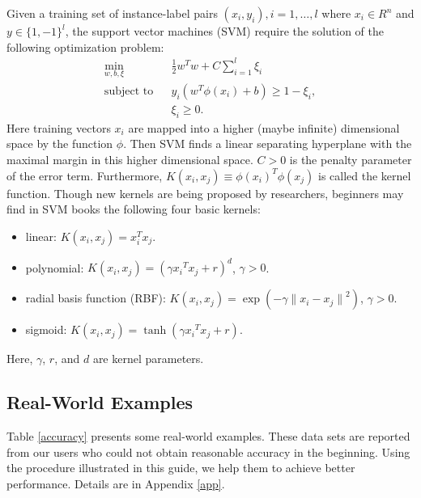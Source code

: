 \documentclass[12pt]{article}
\begin{document}
Given a training set of
instance-label pairs  $(x_i,y_i), i = 1, \ldots, l$
where $x_i \in R^n$ and $y \in
\{1, -1 \}^l$,
the support vector machines (SVM)
\cite{BB92a,CC95a} require
the solution of the following optimization
problem:
 \begin{eqnarray}
\min_{w,b,\xi} && \frac{1}{2}w^T w + C \sum_{i=1}^l \xi_i
\nonumber \\
\mbox{subject to}&& y_i(w^T \phi(x_i) + b) \geq 1 - \xi_i,\label{svml1}\\
&& \xi_i \geq 0. \nonumber
\end{eqnarray}
Here training vectors $x_i$ are mapped into a
higher (maybe infinite) dimensional space
by the function $\phi$.
Then SVM finds a linear separating hyperplane
with the maximal margin in this
higher dimensional space.
$C>0$ is the penalty parameter of
the error term. Furthermore, $K(x_i, x_j) \equiv 
\phi(x_i)^T\phi(x_j)$ is called the kernel function.
Though new kernels are being proposed by researchers, 
beginners may find in SVM books the following four
basic kernels:
\begin{itemize}
\item linear: $K(x_i, x_j) = x_i ^T x_j$.
\item polynomial: $K(x_i, x_j) = (\gamma {x_i}^T x_j + r)^d$, $\gamma > 0$.
\item radial basis function (RBF): $K(x_i, x_j) = 
\exp(-\gamma{\|x_i-x_j\|}^2)$, $\gamma > 0$.
\item sigmoid: $K(x_i, x_j) = \tanh(\gamma {x_i}^T x_j + r)$.
\end{itemize}
Here, $\gamma$, $r$, and $d$ are kernel parameters.

\subsection{Real-World Examples}

Table \ref{accuracy} presents some real-world examples. These data 
sets are reported from our users who could not obtain reasonable 
accuracy in the beginning. Using the procedure illustrated in this 
guide, we help them to achieve better performance. Details are in 
Appendix \ref{app}. 
\end{document}
